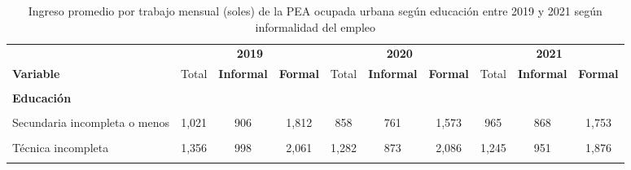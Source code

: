 \documentclass[
  letterpaper,
  12pt,
  oneside,
  spanish,
  doublespacing,
  headsepline,
  parskip]{MastersDoctoralThesis}
\begin{document}
\hypertarget{tbl-ing_edu}{}
\begin{table}[H]
\caption{\label{tbl-ing_edu}Ingreso promedio por trabajo mensual (soles) de la PEA ocupada urbana
según educación entre 2019 y 2021 según informalidad del empleo }\tabularnewline

\centering\begingroup\fontsize{9}{11}\selectfont

\begin{tabular}{>{\raggedright\arraybackslash}p{10em}ccccccccc}
\toprule
\multicolumn{1}{c}{ } & \multicolumn{3}{c}{\textbf{2019}} & \multicolumn{3}{c}{\textbf{2020}} & \multicolumn{3}{c}{\textbf{2021}} \\
\cmidrule(l{3pt}r{3pt}){2-4} \cmidrule(l{3pt}r{3pt}){5-7} \cmidrule(l{3pt}r{3pt}){8-10}
\textbf{Variable} & Total & \textbf{Informal} & \textbf{Formal} & Total & \textbf{Informal} & \textbf{Formal} & Total & \textbf{Informal} & \textbf{Formal}\\
\midrule
\cellcolor{gray!6}{\textbf{Nacional}} & \cellcolor{gray!6}{1,595} & \cellcolor{gray!6}{1,037} & \cellcolor{gray!6}{2,599} & \cellcolor{gray!6}{1,407} & \cellcolor{gray!6}{901} & \cellcolor{gray!6}{2,380} & \cellcolor{gray!6}{1,443} & \cellcolor{gray!6}{989} & \cellcolor{gray!6}{2,473}\\
\textbf{Educación} &  &  &  &  &  &  &  &  & \\
\cellcolor{gray!6}{Sin nivel} & \cellcolor{gray!6}{597} & \cellcolor{gray!6}{520} & \cellcolor{gray!6}{1,610} & \cellcolor{gray!6}{586} & \cellcolor{gray!6}{533} & \cellcolor{gray!6}{1,544} & \cellcolor{gray!6}{569} & \cellcolor{gray!6}{527} & \cellcolor{gray!6}{1,709}\\
Secundaria incompleta o menos & 1,021 & 906 & 1,812 & 858 & 761 & 1,573 & 965 & 868 & 1,753\\
\cellcolor{gray!6}{Secundaria completa} & \cellcolor{gray!6}{1,367} & \cellcolor{gray!6}{1,085} & \cellcolor{gray!6}{2,068} & \cellcolor{gray!6}{1,164} & \cellcolor{gray!6}{921} & \cellcolor{gray!6}{1,833} & \cellcolor{gray!6}{1,224} & \cellcolor{gray!6}{1,011} & \cellcolor{gray!6}{1,902}\\
\addlinespace
Técnica incompleta & 1,356 & 998 & 2,061 & 1,282 & 873 & 2,086 & 1,245 & 951 & 1,876\\
\cellcolor{gray!6}{Técnica completa} & \cellcolor{gray!6}{1,789} & \cellcolor{gray!6}{1,162} & \cellcolor{gray!6}{2,291} & \cellcolor{gray!6}{1,635} & \cellcolor{gray!6}{983} & \cellcolor{gray!6}{2,131} & \cellcolor{gray!6}{1,681} & \cellcolor{gray!6}{1,075} & \cellcolor{gray!6}{2,254}\\

\end{tabular}
\end{table}
\end{document}
